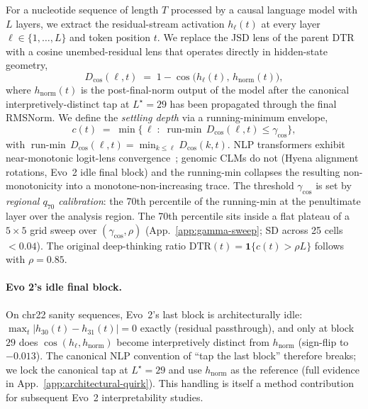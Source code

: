 \documentclass{article}
\theoremstyle{plain}
\theoremstyle{definition}
\theoremstyle{remark}
\newcommand{\hl}{h_{\ell}}
\newcommand{\hnorm}{h_{\mathrm{norm}}}
\newcommand{\Dcos}{D_{\cos}}
\newcommand{\runmin}{\operatorname{run\text{-}min}}
\begin{document}
For a nucleotide sequence of length $T$ processed by a causal language model with $L$ layers, we extract the residual-stream activation $\hl(t)$ at every layer $\ell\!\in\!\{1,\ldots,L\}$ and token position $t$. We replace the JSD lens of the parent DTR~\cite{chen2026deepthinking} with a cosine unembed-residual lens that operates directly in hidden-state geometry,
\begin{equation}
  \Dcos(\ell, t) \;=\; 1 - \cos\!\bigl(\hl(t),\, \hnorm(t)\bigr),
  \label{eq:cos-lens}
\end{equation}
where $\hnorm(t)$ is the post-final-norm output of the model after the canonical interpretively-distinct tap at $L^\star\!=\!29$ has been propagated through the final RMSNorm. We define the \emph{settling depth} via a running-minimum envelope,
\begin{equation}
  c(t) \;=\; \min\bigl\{\, \ell \;:\; \runmin\,\Dcos(\ell, t) \le \gamma_{\cos}\bigr\},
  \label{eq:settling}
\end{equation}
with $\runmin\,\Dcos(\ell,t) = \min_{k\le\ell}\Dcos(k,t)$. NLP transformers exhibit near-monotonic logit-lens convergence~\cite{nostalgebraist2020logitlens,belrose2023tunedlens}; genomic CLMs do not (Hyena alignment rotations, Evo~2 idle final block) and the running-min collapses the resulting non-monotonicity into a monotone-non-increasing trace. The threshold $\gamma_{\cos}$ is set by \emph{regional $q_{70}$ calibration}: the 70th percentile of the running-min at the penultimate layer over the analysis region. The 70th percentile sits inside a flat plateau of a $5\!\times\!5$ grid sweep over $(\gamma_{\cos},\rho)$ (App.~\ref{app:gamma-sweep}; SD across 25 cells $<0.04$). The original deep-thinking ratio $\mathrm{DTR}(t)\!=\!\mathbf{1}\{c(t) \!>\! \rho L\}$ follows with $\rho\!=\!0.85$.

\paragraph{Evo 2's idle final block.} On chr22 sanity sequences, Evo~2's last block is architecturally idle: $\max_{t}|h_{30}(t)\!-\!h_{31}(t)|\!=\!0$ exactly (residual passthrough), and only at block $29$ does $\cos(h_{\ell},\hnorm)$ become interpretively distinct from $\hnorm$ (sign-flip to $-0.013$). The canonical NLP convention of ``tap the last block'' therefore breaks; we lock the canonical tap at $L^\star\!=\!29$ and use $\hnorm$ as the reference (full evidence in App.~\ref{app:architectural-quirk}). This handling is itself a method contribution for subsequent Evo~2 interpretability studies.
\end{document}
